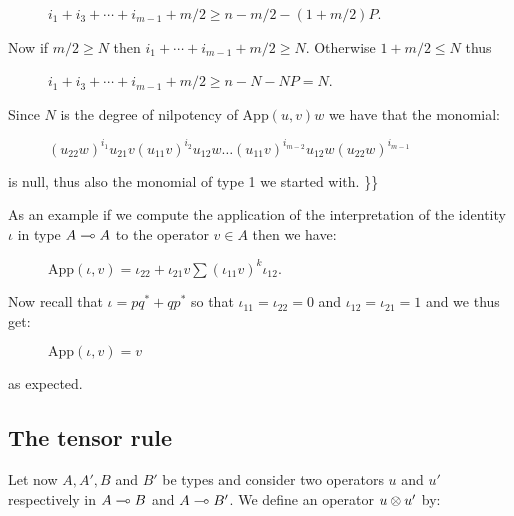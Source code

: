 \begin{description}
\item[]
\(i_1+i_3+\cdots +i_{m-1} + m/2\geq n - m/2 - (1+m/2)P\).
\end{description}

Now if \(m/2\geq N\) then \(i_1+\cdots+i_{m-1}+m/2 \geq N\). Otherwise
\(1+m/2\leq N\) thus

\begin{description}
\item[]
\(i_1+i_3+\cdots +i_{m-1} + m/2\geq n - N - NP = N\).
\end{description}

Since \(N\) is the degree of nilpotency of \(\mathrm{App}(u,v)w\) we
have that the monomial:

\begin{description}
\item[]
\((u_{22}w)^{i_1}u_{21}v(u_{11}v)^{i_2}u_{12}w\dots(u_{11}v)^{i_{m-2}}u_{12}w(u_{22}w)^{i_{m-1}}\)
\end{description}

is null, thus also the monomial of type 1 we started with. \}\}

As an example if we compute the application of the interpretation of the
identity \(\iota\) in type \(A\multimap A\) to the operator \(v\in A\) then
we have:

\begin{description}
\item[]
\(\mathrm{App}(\iota, v) = \iota_{22} + \iota_{21}v\sum(\iota_{11}v)^k\iota_{12}\).
\end{description}

Now recall that \(\iota = pq^* + qp^*\) so that
\(\iota_{11} = \iota_{22} = 0\) and \(\iota_{12} = \iota_{21} = 1\) and
we thus get:

\begin{description}
\item[]
\(\mathrm{App}(\iota, v) = v\)
\end{description}

as expected.

\subsection{The tensor rule}\label{the-tensor-rule}

Let now \(A, A', B\) and \(B'\) be types and consider two operators
\(u\) and \(u'\) respectively in \(A\multimap B\) and \(A\multimap B'\). We
define an operator \(u\otimes u'\) by:

